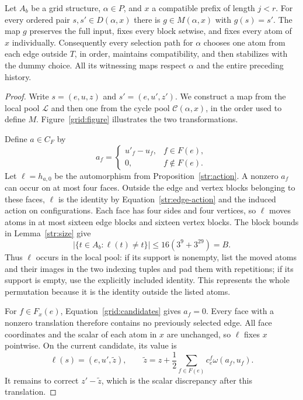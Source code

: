 \begin{proposition}
\label{grid:transitivity}
Let $A_b$ be a grid structure, $\alpha\in P$, and $x$ a compatible prefix
of length $j<r$.  For every ordered pair $s,s'\in D(\alpha,x)$ there is
$g\in M(\alpha,x)$ with $g(s)=s'$.  The map $g$ preserves the full input,
fixes every block setwise, and fixes every atom of $x$ individually.
Consequently every selection path for $\alpha$ chooses one atom from
each edge outside $T$, in order, maintains compatibility, and then
stabilizes with the dummy choice.  All its witnessing maps respect
$\alpha$ and the entire preceding history.
\end{proposition}
\begin{proof}
Write $s=(e,u,z)$ and $s'=(e,u',z')$.  We construct a map from the local
pool $\mathcal L$ and then one from the cycle pool
$\mathcal C(\alpha,x)$, in the order used to define $M$.
Figure~\ref{grid:figure} illustrates the two transformations.

Define $a\in C_F$ by
\[
 a_f=\begin{cases}
       u'_f-u_f,&f\in F(e),\\
       0,&f\notin F(e).
     \end{cases}
\]
Let $\ell=h_{a,0}$ be the automorphism from
Proposition~\ref{str:action}.  A nonzero $a_f$ can occur on at most four
faces.  Outside the edge and vertex blocks belonging to these faces,
$\ell$ is the identity by Equation~\eqref{str:edge-action} and the
induced action on configurations.  Each face has four sides and four
vertices, so $\ell$ moves atoms in at most sixteen edge blocks and
sixteen vertex blocks.  The block bounds in Lemma~\ref{str:size} give
\[
 |\{t\in A_b:\ell(t)\ne t\}|
 \le16(3^9+3^{29})=B.
\]
Thus $\ell$ occurs in the local pool: if its support is nonempty, list
the moved atoms and their images in the two indexing tuples and pad
them with repetitions; if its support is empty, use the explicitly
included identity.  This represents the whole permutation because it
is the identity outside the listed atoms.

For $f\in F_x(e)$, Equation~\eqref{grid:candidates} gives $a_f=0$.
Every face with a nonzero translation therefore contains no previously
selected edge.  All face coordinates and the scalar of each atom in
$x$ are unchanged, so $\ell$ fixes $x$ pointwise.  On the current
candidate, its value is
\begin{equation}\label{grid:post-local-scalar}
 \ell(s)=(e,u',\widetilde z),\qquad
 \widetilde z=z+\frac12\sum_{f\in F(e)}c^f_e\omega(a_f,u_f).
\end{equation}
It remains to correct $z'-\widetilde z$, which is the scalar discrepancy
after this translation.


\end{proof}
